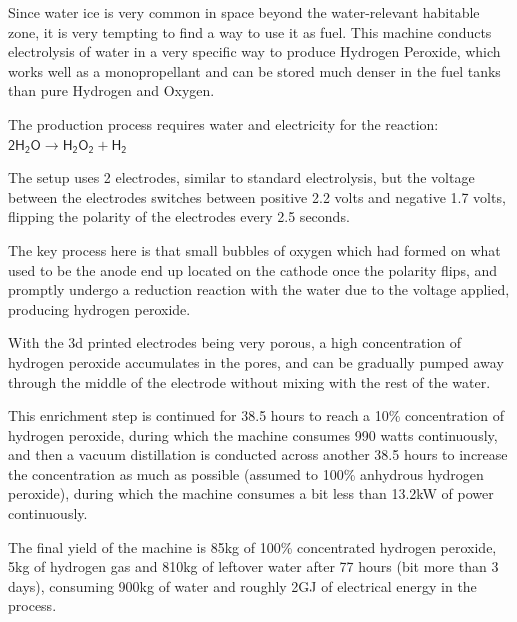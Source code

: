 \documentclass[a4paper]{article}
\begin{document}
	\medskip
	
	Since water ice is very common in space beyond the water-relevant habitable zone, it is very tempting to find a way to use it as fuel. This machine conducts electrolysis of water in a very specific way to produce Hydrogen Peroxide, which works well as a monopropellant and can be stored much denser in the fuel tanks than pure Hydrogen and Oxygen.
	
	\medskip
	
	The production process requires water and electricity for the reaction: $ \mathsf{ 2H_2O \rightarrow H_2O_2 + H_2 } $
	
	\medskip
	
	The setup uses 2 electrodes, similar to standard electrolysis, but the voltage between the electrodes switches between positive 2.2 volts and negative 1.7 volts, flipping the polarity of the electrodes every 2.5 seconds.
	
	\medskip
	
	The key process here is that small bubbles of oxygen which had formed on what used to be the anode end up located on the cathode once the polarity flips, and promptly undergo a reduction reaction with the water due to the voltage applied, producing hydrogen peroxide.
	
	\medskip
	
	With the 3d printed electrodes being very porous, a high concentration of hydrogen peroxide accumulates in the pores, and can be gradually pumped away through the middle of the electrode without mixing with the rest of the water.
	
	
	
	\medskip
	
	This enrichment step is continued for 38.5 hours to reach a 10\% concentration of hydrogen peroxide, during which the machine consumes 990 watts continuously, and then a vacuum distillation is conducted across another 38.5 hours to increase the concentration as much as possible (assumed to 100\% anhydrous hydrogen peroxide), during which the machine consumes a bit less than 13.2kW of power continuously.
	
	\bigskip
	
	The final yield of the machine is 85kg of 100\% concentrated hydrogen peroxide, 5kg of hydrogen gas and 810kg of leftover water after 77 hours (bit more than 3 days), consuming 900kg of water and roughly 2GJ of electrical energy in the process.
	
\end{document}
